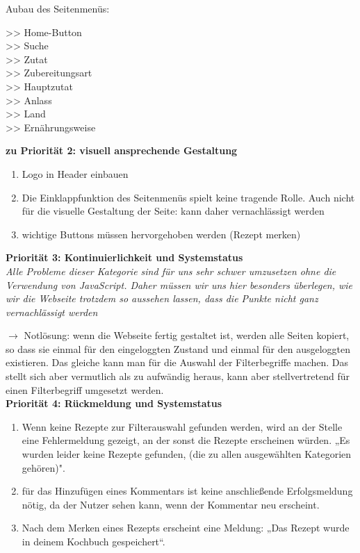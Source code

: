 \documentclass[parskip,10pt,abstracton]{scrartcl}
\begin{document}
Aubau des Seitenmenüs:\\[-3em]
\begin{addmargin}[25pt]{0pt}
>> Home-Button\\[0.4em]
>> Suche\\
>> Zutat\\[0.4em]
>> Zubereitungsart\\
>> Hauptzutat\\[0.4em]
>> Anlass\\
>> Land\\[0.4em]
>> Ernährungsweise\\
\end{addmargin}

\textbf{zu Priorität 2: visuell ansprechende Gestaltung}

\begin{enumerate}[$\to$]
 \item Logo in Header einbauen\\[-2.5em]
 \item Die Einklappfunktion des Seitenmenüs spielt keine tragende Rolle. Auch nicht für die visuelle Gestaltung der Seite: kann daher vernachlässigt werden\\[-2.5em]
 \item wichtige Buttons müssen hervorgehoben werden (Rezept merken)\\
\end{enumerate}


\textbf{Priorität 3: Kontinuierlichkeit und Systemstatus}\\
\textit{Alle Probleme dieser Kategorie sind für uns sehr schwer umzusetzen ohne die Verwendung von JavaScript. Daher müssen wir uns hier besonders überlegen, wie wir die Webseite trotzdem so aussehen lassen, dass die Punkte nicht ganz vernachlässigt werden}

$\to$ Notlösung: wenn die Webseite fertig gestaltet ist, werden alle Seiten kopiert, so dass sie einmal für den eingeloggten Zustand und einmal für den ausgeloggten existieren. Das gleiche kann man für die Auswahl der Filterbegriffe machen. Das stellt sich aber vermutlich als zu aufwändig heraus, kann aber stellvertretend für einen Filterbegriff umgesetzt werden.\\

\textbf{Priorität 4: Rückmeldung und Systemstatus}

\begin{enumerate}[$\to$]
 \item Wenn keine Rezepte zur Filterauswahl gefunden werden, wird an der Stelle eine Fehlermeldung gezeigt, an der sonst die Rezepte erscheinen würden. „Es wurden leider keine Rezepte gefunden, (die zu allen ausgewählten Kategorien gehören)".\\[-2.5em]
 \item für das Hinzufügen eines Kommentars ist keine anschließende Erfolgsmeldung nötig, da der Nutzer sehen kann, wenn der Kommentar neu erscheint.\\[-2.5em]
 \item Nach dem Merken eines Rezepts erscheint eine Meldung: „Das Rezept wurde in deinem Kochbuch gespeichert“.\\
\end{enumerate}
\end{document}
